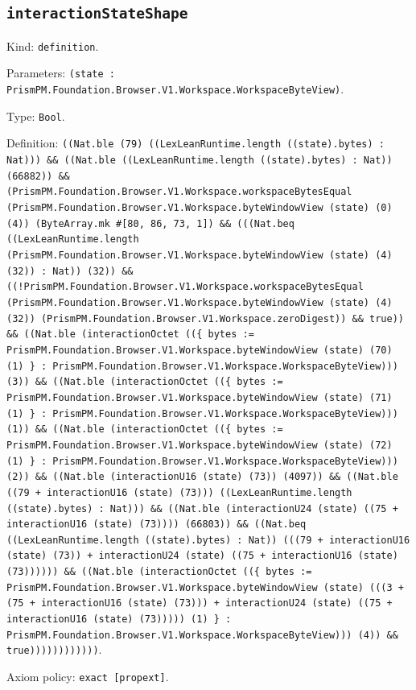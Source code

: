 \documentclass[11pt]{article}
\begin{document}
\subsection*{\texttt{interactionStateShape}}
\noindent Kind: \texttt{definition}.\par
\noindent Parameters: \texttt{(state : PrismPM.Foundation.Browser.V1.Workspace.WorkspaceByteView)}.\par
\noindent Type: \texttt{Bool}.\par
\noindent Definition: \texttt{((Nat.ble (79) ((LexLeanRuntime.length ((state).bytes) : Nat))) \&\& ((Nat.ble ((LexLeanRuntime.length ((state).bytes) : Nat)) (66882)) \&\& (PrismPM.Foundation.Browser.V1.Workspace.workspaceBytesEqual (PrismPM.Foundation.Browser.V1.Workspace.byteWindowView (state) (0) (4)) (ByteArray.mk \#[80, 86, 73, 1]) \&\& (((Nat.beq ((LexLeanRuntime.length (PrismPM.Foundation.Browser.V1.Workspace.byteWindowView (state) (4) (32)) : Nat)) (32)) \&\& ((!PrismPM.Foundation.Browser.V1.Workspace.workspaceBytesEqual (PrismPM.Foundation.Browser.V1.Workspace.byteWindowView (state) (4) (32)) (PrismPM.Foundation.Browser.V1.Workspace.zeroDigest)) \&\& true)) \&\& ((Nat.ble (interactionOctet ((\{ bytes := PrismPM.Foundation.Browser.V1.Workspace.byteWindowView (state) (70) (1) \} : PrismPM.Foundation.Browser.V1.Workspace.WorkspaceByteView))) (3)) \&\& ((Nat.ble (interactionOctet ((\{ bytes := PrismPM.Foundation.Browser.V1.Workspace.byteWindowView (state) (71) (1) \} : PrismPM.Foundation.Browser.V1.Workspace.WorkspaceByteView))) (1)) \&\& ((Nat.ble (interactionOctet ((\{ bytes := PrismPM.Foundation.Browser.V1.Workspace.byteWindowView (state) (72) (1) \} : PrismPM.Foundation.Browser.V1.Workspace.WorkspaceByteView))) (2)) \&\& ((Nat.ble (interactionU16 (state) (73)) (4097)) \&\& ((Nat.ble ((79 + interactionU16 (state) (73))) ((LexLeanRuntime.length ((state).bytes) : Nat))) \&\& ((Nat.ble (interactionU24 (state) ((75 + interactionU16 (state) (73)))) (66803)) \&\& ((Nat.beq ((LexLeanRuntime.length ((state).bytes) : Nat)) (((79 + interactionU16 (state) (73)) + interactionU24 (state) ((75 + interactionU16 (state) (73)))))) \&\& ((Nat.ble (interactionOctet ((\{ bytes := PrismPM.Foundation.Browser.V1.Workspace.byteWindowView (state) (((3 + (75 + interactionU16 (state) (73))) + interactionU24 (state) ((75 + interactionU16 (state) (73))))) (1) \} : PrismPM.Foundation.Browser.V1.Workspace.WorkspaceByteView))) (4)) \&\& true))))))))))))}.\par
\noindent Axiom policy: \texttt{exact [propext]}.\par
\end{document}

